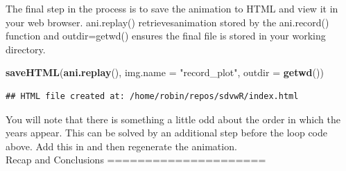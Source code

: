 \documentclass[]{article}
\newenvironment{Shaded}{}{}
\newcommand{\KeywordTok}[1]{\textcolor[rgb]{0.00,0.44,0.13}{\textbf{{#1}}}}
\newcommand{\DataTypeTok}[1]{\textcolor[rgb]{0.56,0.13,0.00}{{#1}}}
\newcommand{\DecValTok}[1]{\textcolor[rgb]{0.25,0.63,0.44}{{#1}}}
\newcommand{\FloatTok}[1]{\textcolor[rgb]{0.25,0.63,0.44}{{#1}}}
\newcommand{\StringTok}[1]{\textcolor[rgb]{0.25,0.44,0.63}{{#1}}}
\newcommand{\NormalTok}[1]{{#1}}
\begin{document}
\begin{Shaded}
\end{Shaded}
The final step in the process is to save the animation to HTML and view
it in your web browser. ani.replay() retrievesanimation stored by the
ani.record() function and outdir=getwd() ensures the final file is
stored in your working directory.

\begin{Shaded}
\begin{Highlighting}[]
\KeywordTok{saveHTML}\NormalTok{(}\KeywordTok{ani.replay}\NormalTok{(), }\DataTypeTok{img.name =} \StringTok{"record_plot"}\NormalTok{, }\DataTypeTok{outdir =} \KeywordTok{getwd}\NormalTok{())}
\end{Highlighting}
\end{Shaded}
\begin{verbatim}
## HTML file created at: /home/robin/repos/sdvwR/index.html
\end{verbatim}
You will note that there is something a little odd about the order in
which the years appear. This can be solved by an additional step before
the loop code above. Add this in and then regenerate the
animation.\\Recap and Conclusions =====================
\end{document}
